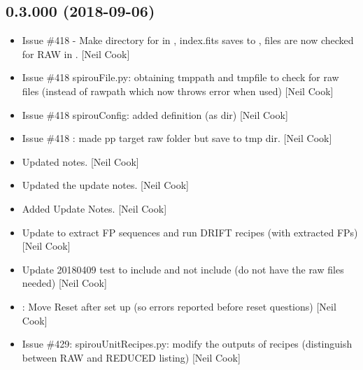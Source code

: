 \documentclass[a4paper,10pt,english]{report}
\begin{document}
\subsection{0.3.000 (2018-09-06)}
\label{\detokenize{misc/changelog:id334}}\begin{itemize}
\item {} 
Issue \#418  - Make directory for  in
, index.fits saves to , files are now checked for RAW in
. {[}Neil Cook{]}

\item {} 
Issue \#418 spirouFile.py: obtaining tmppath and tmpfile to check for
raw files (instead of rawpath which now throws error when used) {[}Neil
Cook{]}

\item {} 
Issue \#418 spirouConfig: added  definition (as 
dir) {[}Neil Cook{]}

\item {} 
Issue \#418 : made pp target raw folder but
save to tmp dir. {[}Neil Cook{]}

\item {} 
Updated notes. {[}Neil Cook{]}

\item {} 
Updated the update notes. {[}Neil Cook{]}

\item {} 
Added Update Notes. {[}Neil Cook{]}

\item {} 
Update  to extract FP sequences and run DRIFT
recipes (with extracted FPs) {[}Neil Cook{]}

\item {} 
Update 20180409 test to include  and not include
 (do not have the raw files needed) {[}Neil Cook{]}

\item {} 
: Move Reset after set up (so errors reported before reset
questions) {[}Neil Cook{]}

\item {} 
Issue \#429: spirouUnitRecipes.py: modify the outputs of 
recipes (distinguish between RAW and REDUCED listing) {[}Neil Cook{]}


\end{itemize}
\end{document}

